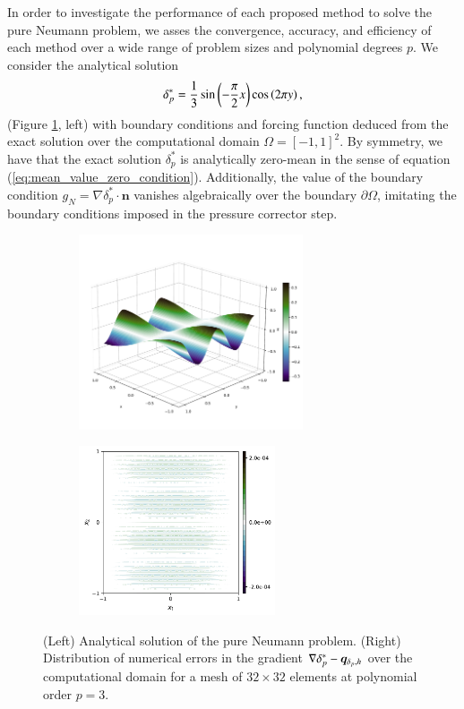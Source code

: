 In order to investigate the performance of each proposed method to solve the pure Neumann problem, we asses the convergence, accuracy, and efficiency of each method over a wide range of problem sizes and polynomial degrees $p$.
We consider the analytical solution
\begin{equation}
    \delta_{p}^* = \frac{1}{3} \sin\left(-\frac{\pi}{2} x \right) \cos\left(2\pi y\right),
\end{equation}
(Figure \ref{fig:dp_neumann_problem_analytical}, left) with boundary conditions and forcing function deduced from the exact solution over the computational domain $\Omega = [-1, 1]^2$. 
By symmetry, we have that the exact solution $\delta_p^*$ is analytically zero-mean in the sense of equation (\ref{eq:mean_value_zero_condition}).
Additionally, the value of the boundary condition $g_N = \nabla \delta_p^* \cdot\bm{n}$ vanishes algebraically over the boundary $\partial \Omega$, imitating the boundary conditions imposed in the pressure corrector step.
\begin{figure}[htpb]
  \centering
    \begin{subfigure}{0.45\textwidth}
      \includegraphics[height=5.75cm]{img/dp_study_analytical.pdf} 
    \end{subfigure}
    \begin{subfigure}{0.45\textwidth}
        \includegraphics[height=5cm]{img/PNP_32x32_errors.pdf}
    \end{subfigure}
      \caption{(Left) Analytical solution of the pure Neumann problem. 
        (Right) Distribution of numerical errors in the gradient $\nabla\delta_p^* - \bm{q}_{\delta_{p},h}$ over the computational domain for a mesh of $32\times 32$ elements at polynomial order $p=3$.}
  \label{fig:dp_neumann_problem_analytical}
\end{figure}
